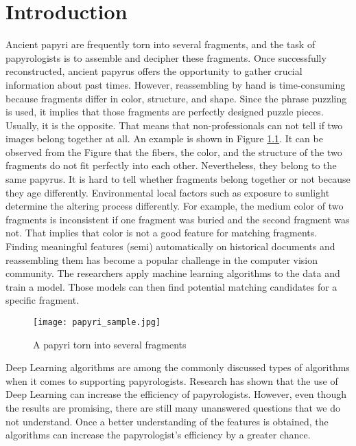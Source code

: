\chapter{Introduction}
\label{chap:intro}
Ancient papyri are frequently torn into several fragments, and the task of papyrologists is to assemble
and decipher these fragments. Once successfully reconstructed, ancient papyrus offers the opportunity
to gather crucial information about past times. However, reassembling by hand is time-consuming
because fragments differ in color, structure, and shape. Since the phrase puzzling is used, it implies that those fragments are perfectly designed puzzle pieces. Usually, it is the opposite. That means that non-professionals can not tell if two images belong together at all. An example is shown in Figure \ref{fig:papyri_sample}. It can be observed from the Figure that the fibers, the color, and the structure of the two fragments do not fit perfectly into each other. Nevertheless, they belong to the same papyrus. It is hard to tell whether fragments belong together or not because they age differently. Environmental local factors such as exposure to sunlight determine the altering process differently. For example, the medium color of two fragments is inconsistent if one fragment was buried and the second fragment was not. That implies that color is not a good feature for matching fragments.\\
Finding meaningful features (semi) automatically on historical documents and reassembling them has become a popular challenge in the computer vision community. The researchers apply machine learning algorithms to the data and train a model. Those models can then find potential matching candidates for a specific fragment.
\begin{figure}[t]
	\label{fig:papyri_sample}
	\texttt{[image: papyri\_sample.jpg]}
	\caption{A papyri torn into several fragments}
\end{figure}
Deep Learning algorithms are among the commonly discussed types of algorithms when it comes to supporting papyrologists. Research has shown that the use of Deep Learning can increase the efficiency of papyrologists. However, even though the results are promising, there are still many unanswered questions that we do not understand. Once a better understanding of the features is obtained, the algorithms can increase the papyrologist's efficiency by a greater chance. 


